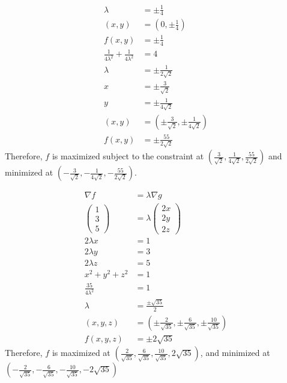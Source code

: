 \documentclass[8pt]{extarticle}
\begin{document}
\begin{problem}{15.3}
\begin{description}[font=\normalfont]
\begin{align*}
          \lambda &= \pm \frac{1}{4}\\
          (x,y) &= \left(0,\pm \frac{1}{4}\right)\\
          f(x,y) &= \pm\frac{1}{4}\\
          \frac{1}{4\lambda^2} + \frac{1}{4\lambda^2} &= 4\tag*{$x = 6\lambda$}\\
          \lambda &= \pm\frac{1}{2\sqrt{2}}\\
          x &= \pm\frac{3}{\sqrt{2}}\\
          y &= \pm \frac{1}{4\sqrt{2}}\\
          (x,y) &= \left(\pm \frac{3}{\sqrt{2}},\pm\frac{1}{4\sqrt{2}}\right)\\
          f(x,y) &= \pm\frac{55}{2\sqrt{2}}
        \end{align*}
        Therefore, $f$ is maximized subject to the constraint at $\left(\frac{3}{\sqrt{2}},\frac{1}{4\sqrt{2}},\frac{55}{2\sqrt{2}}\right)$ and minimized at $\left(-\frac{3}{\sqrt{2}},-\frac{1}{4\sqrt{2}},-\frac{55}{2\sqrt{2}}\right)$.
      \item[10:]
        \begin{align*}
          \nabla f &= \lambda \nabla g\\
          \begin{pmatrix}1\\3\\5\end{pmatrix} &= \lambda \begin{pmatrix}2x\\2y\\2z\end{pmatrix}\\
          2\lambda x &= 1\\
          2\lambda y &= 3\\
          2\lambda z &= 5\\
          x^2 + y^2 + z^2 &= 1\\
          \frac{35}{4\lambda^2} &= 1\\
          \lambda &= \frac{\pm\sqrt{35}}{2}\\
          (x,y,z) &= \left(\pm\frac{2}{\sqrt{35}},\pm\frac{6}{\sqrt{35}},\pm\frac{10}{\sqrt{35}}\right)\\
          f(x,y,z) &= \pm2\sqrt{35}
        \end{align*}
        Therefore, $f$ is maximized at $\left(\frac{2}{\sqrt{35}},\frac{6}{\sqrt{35}},\frac{10}{\sqrt{35}},2\sqrt{35}\right)$, and minimized at $\left(-\frac{2}{\sqrt{35}},-\frac{6}{\sqrt{35}},-\frac{10}{\sqrt{35}},-2\sqrt{35}\right)$

\end{description}
\end{problem}
\end{document}
